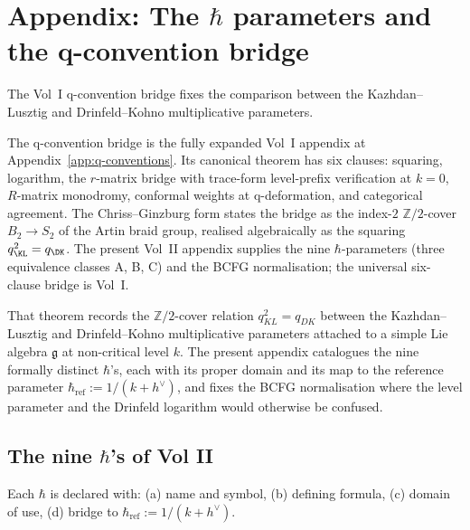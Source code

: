 \chapter{Appendix: The \texorpdfstring{$\hbar$}{hbar} parameters and the q-convention bridge}
\label{app:q-conventions-v2}

The Vol~I q-convention bridge fixes the comparison between the
Kazhdan--Lusztig and Drinfeld--Kohno multiplicative parameters.

\begin{remark}
\label{rem:q-bridge-vol1-canonical-pointer}
The q-convention bridge is the fully expanded Vol~I appendix at
Appendix~\ref{app:q-conventions}. Its canonical theorem has six
clauses: squaring, logarithm, the $r$-matrix bridge with trace-form
level-prefix verification at $k=0$, $R$-matrix monodromy, conformal
weights at q-deformation, and categorical agreement. The
Chriss--Ginzburg form states the bridge as the index-$2$
$\mathbb{Z}/2$-cover $B_2 \to S_2$ of the Artin braid group, realised
algebraically as the squaring $q_{\KL}^2 = q_{\DK}$. The present Vol~II
appendix supplies the nine $\hbar$-parameters (three equivalence classes A, B, C) and
the BCFG normalisation; the universal six-clause bridge is Vol~I.
\end{remark}
 That theorem
records the $\mathbb{Z}/2$-cover relation $q_{KL}^{2}=q_{DK}$ between the
Kazhdan--Lusztig and Drinfeld--Kohno multiplicative parameters attached to a
simple Lie algebra $\mathfrak{g}$ at non-critical level $k$. The present
appendix catalogues the nine formally distinct $\hbar$'s, each with
its proper domain and its map to the reference parameter
$\hbar_{\mathrm{ref}} := 1/(k+h^\vee)$, and fixes the BCFG
normalisation where the level parameter and the Drinfeld logarithm
would otherwise be confused.

\section{The nine $\hbar$'s of Vol II}
\label{sec:hbar-zoo-vol2}

Each $\hbar$ is declared with: (a) name and symbol, (b) defining formula, (c)
domain of use, (d) bridge to $\hbar_{\mathrm{ref}} := 1/(k+h^\vee)$.

